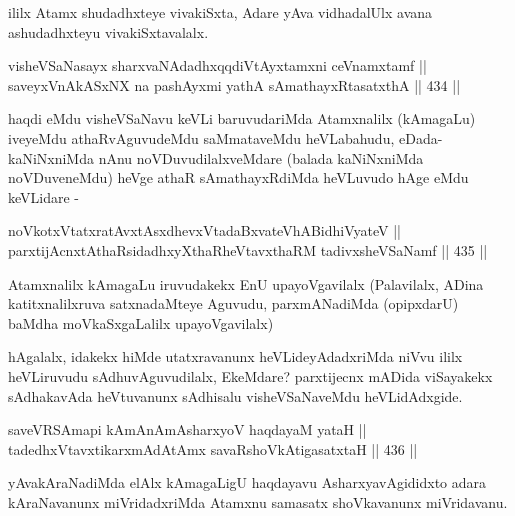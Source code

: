 \begin{artha}
ililx Atamx shudadhxteye vivakiSxta, Adare yAva vidhadalUlx avana ashudadhxteyu vivakiSxtavalalx.
\end{artha}


\begin{shl}
visheVSaNasayx sharxvaNAdadhxqqdiVtAyxtamxni ceVnamxtamf || \\
saveyxVnAkASxNX na pashAyxmi yathA sAmathayxRtasatxthA \hfill || 434 ||  
\end{shl}

\begin{artha}
haqdi eMdu visheVSaNavu keVLi baruvudariMda Atamxnalilx\break
(kAmagaLu) iveyeMdu athaRvAguvudeMdu saMmataveMdu heVLabahudu,
eDada-kaNiNxniMda nAnu noVDuvudilalxveMdare (balada kaNiNxniMda
noVDuveneMdu) heVge athaR sAmathayxRdiMda heVLuvudo hAge eMdu
keVLidare -
\end{artha}


\begin{shl}
noVkotxVtatxratAvxtAsxdhevxVtadaBxvateVhABidhiVyateV || \\
parxtijAcnxtAthaRsidadhxyXthaRheVtavxthaRM tadivxsheVSaNamf \hfill || 435 ||  
\end{shl}

\begin{artha}
Atamxnalilx kAmagaLu iruvudakekx EnU upayoVgavilalx (Palavilalx, ADina
katitxnalilxruva satxnadaMteye Aguvudu, parxmANadiMda (opipxdarU)
baMdha moVkaSxgaLalilx upayoVgavilalx)
\end{artha}

\begin{artha}
hAgalalx, idakekx hiMde utatxravanunx heVLideyAdadxriMda niVvu ililx
heVLiruvudu sAdhuvAguvudilalx, EkeMdare? parxtijecnx
mADida viSayakekx sAdhakavAda heVtuvanunx sAdhisalu visheVSaNaveMdu\break
heVLidAdxgide.
\end{artha}


\begin{shl}
saveVRSAmapi kAmAnAmAsharxyoV haqdayaM yataH || \\
tadedhxVtavxtikarxmAdAtAmx savaRshoVkAtigasatxtaH \hfill || 436 ||  
\end{shl}

\begin{artha}
yAvakAraNadiMda elAlx kAmagaLigU haqdayavu AsharxyavAgididxto adara
kAraNavanunx miVridadxriMda Atamxnu samasatx shoVkavanunx miVridavanu.
\end{artha}

